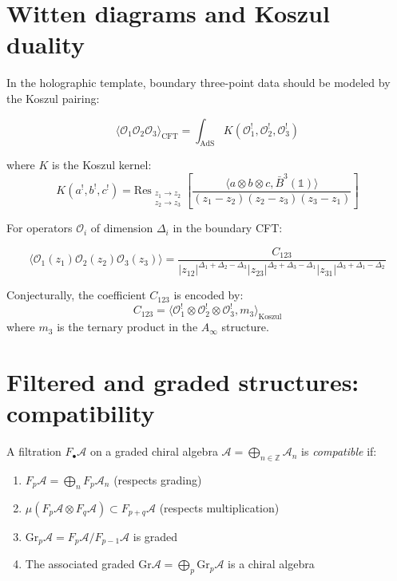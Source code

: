 \section{Witten diagrams and Koszul duality}

\begin{technique}[Witten-diagram shadow = Koszul pairing]
In the holographic template, boundary three-point data should be
modeled by the Koszul pairing:

\[\langle \mathcal{O}_1 \mathcal{O}_2 \mathcal{O}_3 \rangle_{\text{CFT}} = \int_{\text{AdS}} K(\mathcal{O}_1^!, \mathcal{O}_2^!, \mathcal{O}_3^!)\]

where $K$ is the Koszul kernel:
\[K(a^!, b^!, c^!) = \text{Res}_{\substack{z_1 \to z_2 \\ z_2 \to z_3}} \left[\frac{\langle a \otimes b \otimes c, \bar{B}^3(\mathbb{1}) \rangle}{(z_1-z_2)(z_2-z_3)(z_3-z_1)}\right]\]
\end{technique}

\begin{example}
For operators $\mathcal{O}_i$ of dimension $\Delta_i$ in the boundary CFT:

\[\langle \mathcal{O}_1(z_1) \mathcal{O}_2(z_2) \mathcal{O}_3(z_3) \rangle = \frac{C_{123}}{|z_{12}|^{\Delta_1+\Delta_2-\Delta_3}|z_{23}|^{\Delta_2+\Delta_3-\Delta_1}|z_{31}|^{\Delta_3+\Delta_1-\Delta_2}}\]

Conjecturally, the coefficient $C_{123}$ is encoded by:
\[C_{123} = \langle \mathcal{O}_1^! \otimes \mathcal{O}_2^! \otimes \mathcal{O}_3^!, m_3 \rangle_{\text{Koszul}}\]
where $m_3$ is the ternary product in the $A_\infty$ structure.
\end{example}

\section{Filtered and graded structures: compatibility}

\begin{definition}
A filtration $F_\bullet\mathcal{A}$ on a graded chiral algebra $\mathcal{A} = \bigoplus_{n \in \mathbb{Z}} \mathcal{A}_n$ is \emph{compatible} if:
\begin{enumerate}
\item $F_p\mathcal{A} = \bigoplus_{n} F_p\mathcal{A}_n$ (respects grading)
\item $\mu(F_p\mathcal{A} \otimes F_q\mathcal{A}) \subset F_{p+q}\mathcal{A}$ (respects multiplication)
\item $\text{Gr}_p\mathcal{A} = F_p\mathcal{A}/F_{p-1}\mathcal{A}$ is graded
\item The associated graded $\text{Gr}\mathcal{A} = \bigoplus_p \text{Gr}_p\mathcal{A}$ is a chiral algebra
\end{enumerate}
\end{definition}

